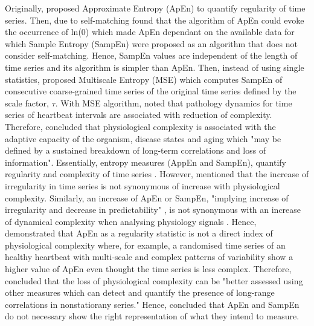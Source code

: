 Originally, \cite{pincus1991, pincus1995} proposed Approximate Entropy (ApEn) 
to quantify regularity of time series.
Then, \cite{richman2000} due to self-matching found that the algorithm 
of ApEn could evoke the occurrence of ln(0) which made ApEn dependant 
on the available 
data for which Sample Entropy (SampEn) were proposed as an algorithm that 
does not consider self-matching. 
Hence, SampEn values are independent of the length of time series and its 
algorithm is simpler than ApEn.
Then, instead of using single statistics, \cite{costa2002} proposed 
Multiscale Entropy (MSE) which computes SampEn of consecutive 
coarse-grained time series of the original time series defined by the 
scale factor, $\tau$.
With MSE algorithm, \citep{costa2002} noted that 
pathology dynamics for time series of heartbeat intervals 
are associated with reduction of complexity.
Therefore, \citealt[p. 3]{costa2002} concluded that physiological complexity 
is associated with the adaptive capacity of the organism,  
disease states and aging which "may be defined by a sustained 
 breakdown of long-term correlations and loss of information".
Essentially, entropy measures (AppEn and SampEn), 
quantify regularity and complexity of time series \citep{preatoni2013}.
However, \cite{goldberger1996} mentioned that the increase of irregularity 
in time series is not synonymous of increase with physiological complexity.
Similarly, an increase of ApEn or SampEn, "implying increase of irregularity 
and decrease in predictability" \cite[p. 25]{goldberger2002b}, is not 
synonymous with an increase of dynamical complexity when analysing physiology 
signals \citep{costa2002}.
Hence, \cite{goldberger2002b} demonstrated that ApEn as a regularity 
statistic is not a direct index of physiological complexity where, for example, 
a randomised time series of an healthy heartbeat with multi-scale and 
complex patterns of variability show a higher value of ApEn even thought 
the time series is less complex. Therefore, \citealt[p. 24]{goldberger2002b} 
concluded that the loss of physiological complexity can be 
"better assessed using other measures which can detect and quantify the 
presence of long-range correlations in nonstatiorany series."
Hence, \cite{goldberger2002b, vaillancourt2002, costa2002} concluded that
ApEn and SampEn do not necessary show the right representation of what 
they intend to measure. 



